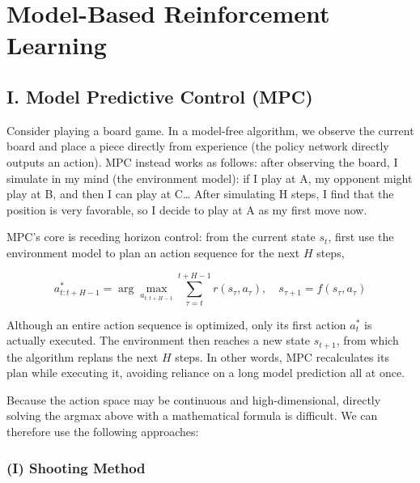 \setcounter{section}{1}

\hypertarget{model-based-reinforcement-learning}{%
\section{Model-Based Reinforcement Learning}\label{model-based-reinforcement-learning}}

\hypertarget{i.-model-predictive-control-mpc}{%
\subsection{I. Model Predictive Control (MPC)}\label{i.-model-predictive-control-mpc}}

Consider playing a board game. In a model-free algorithm, we observe the current board and place a piece directly from experience (the policy network directly outputs an action). MPC instead works as follows: after observing the board, I simulate in my mind (the environment model): if I play at A, my opponent might play at B, and then I can play at C\ldots{} After simulating H steps, I find that the position is very favorable, so I decide to play at A as my first move now.

MPC's core is receding horizon control: from the current state \(s_t\), first use the environment model to plan an action sequence for the next \(H\) steps,

\[
a^*_{t:t+H-1}=\arg\max_{a_{t:t+H-1}}\sum_{\tau=t}^{t+H-1}r(s_\tau,a_\tau),
\quad s_{\tau+1}=f(s_\tau,a_\tau)
\]

Although an entire action sequence is optimized, only its first action \(a_t^*\) is actually executed. The environment then reaches a new state \(s_{t+1}\), from which the algorithm replans the next \(H\) steps. In other words, MPC recalculates its plan while executing it, avoiding reliance on a long model prediction all at once.

Because the action space may be continuous and high-dimensional, directly solving the argmax above with a mathematical formula is difficult. We can therefore use the following approaches:

\hypertarget{i-shooting-method}{%
\subsubsection{(I) Shooting Method}\label{i-shooting-method}}

